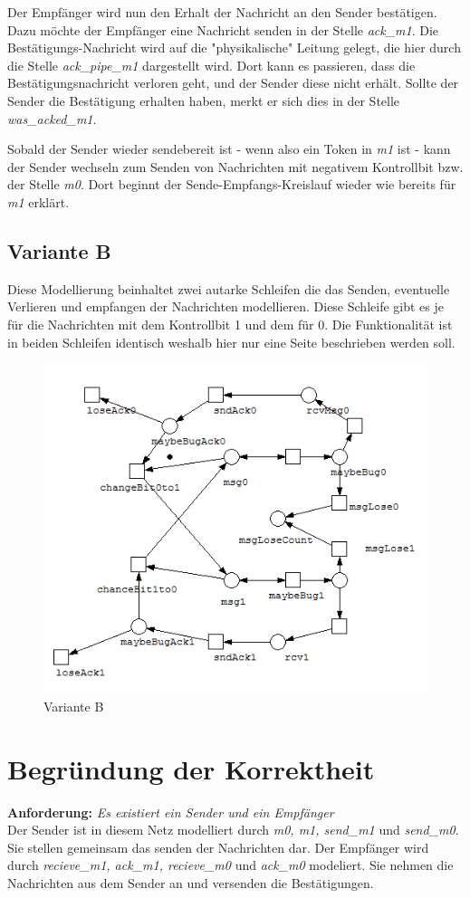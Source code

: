 \documentclass[]{scrartcl}
\begin{document}
Der Empfänger wird nun den Erhalt der Nachricht an den Sender bestätigen. Dazu möchte der Empfänger eine Nachricht senden in der Stelle \textit{ack\_m1}. Die Bestätigungs-Nachricht wird auf die "physikalische" Leitung gelegt, die hier durch die Stelle \textit{ack\_pipe\_m1} dargestellt wird. Dort kann es passieren, dass die Bestätigungsnachricht verloren geht, und der Sender diese nicht erhält. Sollte der Sender die Bestätigung erhalten haben, merkt er sich dies in der Stelle \textit{was\_acked\_m1}.

Sobald der Sender wieder sendebereit ist - wenn also ein Token in \textit{m1} ist - kann der Sender wechseln zum Senden von Nachrichten mit negativem Kontrollbit bzw. der Stelle \textit{m0}. Dort beginnt der Sende-Empfangs-Kreislauf wieder wie bereits für \textit{m1} erklärt.

\subsection{Variante B}
Diese Modellierung beinhaltet zwei autarke Schleifen die das Senden, eventuelle Verlieren und empfangen der Nachrichten modellieren. Diese Schleife gibt es je für die Nachrichten mit dem Kontrollbit 1 und dem für 0. Die Funktionalität ist in beiden Schleifen identisch weshalb hier nur eine Seite beschrieben werden soll.

\begin{figure}[H]
	\centering
	\includegraphics[width=0.7\linewidth]{altBitPro.png}
	\caption{Variante B}
	\label{fig:petri_net_B}
\end{figure}

\section{Begründung der Korrektheit}
\textbf{Anforderung:} \textit{Es existiert ein Sender und ein Empfänger} \\
Der Sender ist in diesem Netz modelliert durch \textit{m0, m1, send\_m1} und \textit{send\_m0}. Sie stellen gemeinsam das senden der Nachrichten dar. Der Empfänger wird durch \textit{recieve\_m1, ack\_m1, recieve\_m0} und \textit{ack\_m0} modeliert. Sie nehmen die Nachrichten aus dem Sender an und versenden die Bestätigungen.\\
\end{document}
